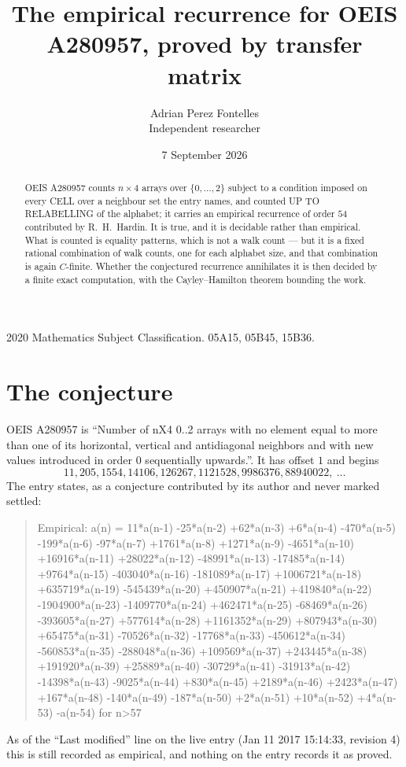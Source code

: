 \documentclass[11pt,a4paper]{article}
\title{The empirical recurrence for OEIS A280957, proved by transfer matrix}
\author{Adrian Perez Fontelles\\ \small Independent researcher}
\date{7 September 2026}
\theoremstyle{plain}
\theoremstyle{definition}
\begin{document}
\maketitle

\begin{abstract}
OEIS A280957 counts $n\times4$ arrays over $\{0,\dots,2\}$ subject to a condition imposed on
every CELL over a neighbour set the entry names, and counted UP TO RELABELLING of the
alphabet; it carries an empirical recurrence of order $54$ contributed by
R.~H.~Hardin. It is true, and it is decidable rather than empirical. What is counted is
equality patterns, which is not a walk count --- but it is a fixed rational combination of
walk counts, one for each alphabet size, and that combination is again $C$-finite. Whether the
conjectured recurrence annihilates it is then decided by a finite exact computation, with the
Cayley--Hamilton theorem bounding the work.
\end{abstract}

\noindent\small 2020 Mathematics Subject Classification. 05A15, 05B45, 15B36.\normalsize

\section{The conjecture}

OEIS A280957 is ``Number of nX4 0..2 arrays with no element equal to more than one of its horizontal, vertical and antidiagonal neighbors and with new values introduced in order 0 sequentially upwards.''. It has offset $1$ and begins
\[
11, 205, 1554, 14106, 126267, 1121528, 9986376, 88940022,\ \dots
\]
The entry states, as a conjecture contributed by its author and never marked settled:
\begin{quote}
Empirical: a(n) = 11*a(n-1) -25*a(n-2) +62*a(n-3) +6*a(n-4) -470*a(n-5) -199*a(n-6) -97*a(n-7) +1761*a(n-8) +1271*a(n-9) -4651*a(n-10) +16916*a(n-11) +28022*a(n-12) -48991*a(n-13) -17485*a(n-14) +9764*a(n-15) -403040*a(n-16) -181089*a(n-17) +1006721*a(n-18) +635719*a(n-19) -545439*a(n-20) +450907*a(n-21) +419840*a(n-22) -1904900*a(n-23) -1409770*a(n-24) +462471*a(n-25) -68469*a(n-26) -393605*a(n-27) +577614*a(n-28) +1161352*a(n-29) +807943*a(n-30) +65475*a(n-31) -70526*a(n-32) -17768*a(n-33) -450612*a(n-34) -560853*a(n-35) -288048*a(n-36) +109569*a(n-37) +243445*a(n-38) +191920*a(n-39) +25889*a(n-40) -30729*a(n-41) -31913*a(n-42) -14398*a(n-43) -9025*a(n-44) +830*a(n-45) +2189*a(n-46) +2423*a(n-47) +167*a(n-48) -140*a(n-49) -187*a(n-50) +2*a(n-51) +10*a(n-52) +4*a(n-53) -a(n-54) for n>57
\end{quote}
As of the ``Last modified'' line on the live entry (Jan 11 2017 15:14:33, revision 4) this is still
recorded as empirical, and nothing on the entry records it as proved.
\end{document}
